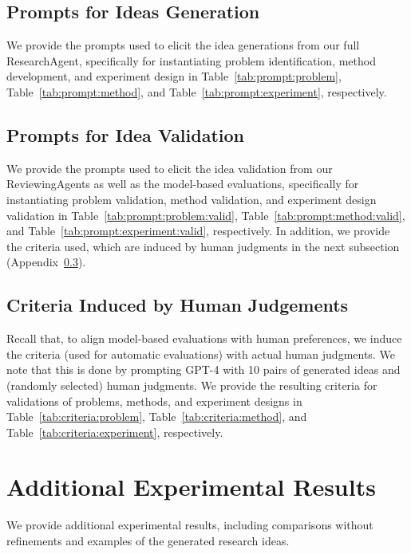 \documentclass[11pt]{article}
\begin{document}
\subsection{Prompts for Ideas Generation}
\label{appendix:prompts:generation}

We provide the prompts used to elicit the idea generations from our full ResearchAgent, specifically for instantiating problem identification, method development, and experiment design in Table~\ref{tab:prompt:problem}, Table~\ref{tab:prompt:method}, and Table~\ref{tab:prompt:experiment}, respectively.

\subsection{Prompts for Idea Validation}
\label{appendix:prompts:validation}

We provide the prompts used to elicit the idea validation from our ReviewingAgents as well as the model-based evaluations, specifically for instantiating problem validation, method validation, and experiment design validation in Table~\ref{tab:prompt:problem:valid}, Table~\ref{tab:prompt:method:valid}, and Table~\ref{tab:prompt:experiment:valid}, respectively. In addition, we provide the criteria used, which are induced by human judgments in the next subsection (Appendix~\ref{appendix:criteria}).

\subsection{Criteria Induced by Human Judgements}
\label{appendix:criteria}

Recall that, to align model-based evaluations with human preferences, we induce the criteria (used for automatic evaluations) with actual human judgments. We note that this is done by prompting GPT-4 with 10 pairs of generated ideas and (randomly selected) human judgments. We provide the resulting criteria for validations of problems, methods, and experiment designs in Table~\ref{tab:criteria:problem}, Table~\ref{tab:criteria:method}, and Table~\ref{tab:criteria:experiment}, respectively.  



\section{Additional Experimental Results}
We provide additional experimental results, including comparisons without refinements and examples of the generated research ideas. 
\end{document}
